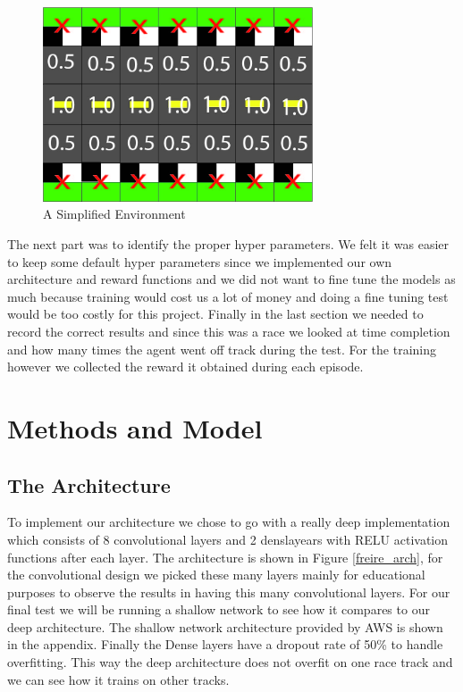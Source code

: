 \documentclass[journal]{IEEEtran}
\begin{document}
\begin{figure}[htbp]
\begin{center}
\includegraphics[width=8cm]{AWS-simplifiedTrack}
\end{center}
\vspace{-2mm}
\caption{A Simplified Environment}
\label{simplifiedTrack}
\end{figure}

The next part was to identify the proper hyper parameters.  We felt it was easier to keep some default hyper parameters since we implemented our own architecture and reward functions and we did not want to fine tune the models as much because training would cost us a lot of money and doing a fine tuning test would be too costly for this project.  
Finally in the last section we needed to record the correct results and since this was a race we looked at time completion and how many times the agent went off track during the test.  For the training however we collected the reward it obtained during each episode.

\section{Methods and Model}
\subsection{The Architecture}
To implement our architecture we chose to go with a really deep implementation which consists of 8 convolutional layers and 2 denslayears with RELU activation functions after each layer. The architecture is shown in Figure \ref{freire_arch}, for the convolutional design we picked these many layers mainly for educational purposes to observe the results in having this many convolutional layers.  For our final test we will be running a shallow network to see how it compares to our deep architecture.  The shallow network architecture provided by AWS is shown in the appendix.  Finally the Dense layers have a dropout rate of 50\% to handle overfitting.  This way the deep architecture does not overfit on one race track and we can see how it trains on other tracks.
\end{document}
